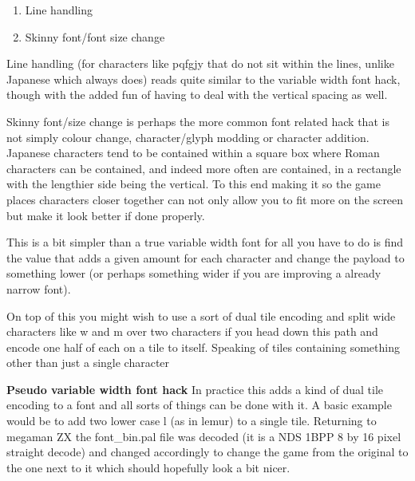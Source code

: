 \documentclass[
]{book}
\providecommand{\tightlist}{%
  \setlength{\itemsep}{0pt}\setlength{\parskip}{0pt}}
\begin{document}
\begin{enumerate}
\def\labelenumi{\arabic{enumi}.}
\tightlist
\item
  Line handling
\item
  Skinny font/font size change
\end{enumerate}

Line handling (for characters like pqfgjy that do not sit within the lines, unlike Japanese which always does) reads quite similar to the variable width font hack, though with the added fun of having to deal with the vertical spacing as well.

Skinny font/size change is perhaps the more common font related hack that is not simply colour change, character/glyph modding or character addition. Japanese characters tend to be contained within a square box where Roman characters can be contained, and indeed more often are contained, in a rectangle with the lengthier side being the vertical. To this end making it so the game places characters closer together can not only allow you to fit more on the screen but make it look better if done properly.

This is a bit simpler than a true variable width font for all you have to do is find the value that adds a given amount for each character and change the payload to something lower (or perhaps something wider if you are improving a already narrow font).

On top of this you might wish to use a sort of dual tile encoding and split wide characters like w and m over two characters if you head down this path and encode one half of each on a tile to itself. Speaking of tiles containing something other than just a single character

\textbf{Pseudo variable width font hack} In practice this adds a kind of dual tile encoding to a font and all sorts of things can be done with it. A basic example would be to add two lower case l (as in lemur) to a single tile. Returning to megaman ZX the font\_bin.pal file was decoded (it is a NDS 1BPP 8 by 16 pixel straight decode) and changed accordingly to change the game from the original to the one next to it which should hopefully look a bit nicer.
\end{document}

